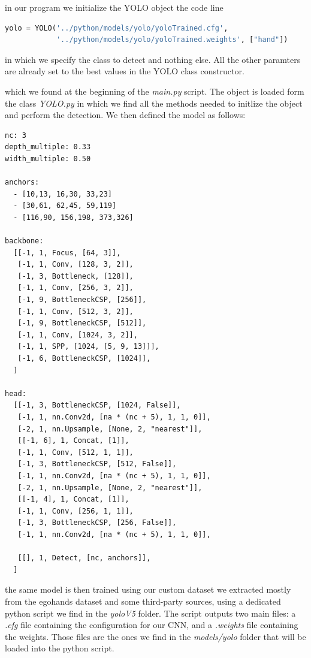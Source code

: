 in our program we initialize the YOLO object the code line 

\begin{lstlisting}[language=python]
    yolo = YOLO('../python/models/yolo/yoloTrained.cfg',
            '../python/models/yolo/yoloTrained.weights', ["hand"])
\end{lstlisting}
in which we specify the class to detect and nothing else. All the other paramters are already set to the best values in the 
YOLO class constructor.

which we found at the beginning of the \textit{main.py} script. The object is loaded form the class \textit{YOLO.py}
in which we find all the methods needed to initlize the object and perform the detection. We then defined the model as follows:

\begin{lstlisting}[]
nc: 3
depth_multiple: 0.33
width_multiple: 0.50

anchors:
  - [10,13, 16,30, 33,23] 
  - [30,61, 62,45, 59,119]
  - [116,90, 156,198, 373,326] 

backbone:
  [[-1, 1, Focus, [64, 3]],
   [-1, 1, Conv, [128, 3, 2]],
   [-1, 3, Bottleneck, [128]],
   [-1, 1, Conv, [256, 3, 2]],
   [-1, 9, BottleneckCSP, [256]],
   [-1, 1, Conv, [512, 3, 2]], 
   [-1, 9, BottleneckCSP, [512]],
   [-1, 1, Conv, [1024, 3, 2]],
   [-1, 1, SPP, [1024, [5, 9, 13]]],
   [-1, 6, BottleneckCSP, [1024]],
  ]

head:
  [[-1, 3, BottleneckCSP, [1024, False]],
   [-1, 1, nn.Conv2d, [na * (nc + 5), 1, 1, 0]],
   [-2, 1, nn.Upsample, [None, 2, "nearest"]],
   [[-1, 6], 1, Concat, [1]],
   [-1, 1, Conv, [512, 1, 1]],
   [-1, 3, BottleneckCSP, [512, False]],
   [-1, 1, nn.Conv2d, [na * (nc + 5), 1, 1, 0]],
   [-2, 1, nn.Upsample, [None, 2, "nearest"]],
   [[-1, 4], 1, Concat, [1]],
   [-1, 1, Conv, [256, 1, 1]],
   [-1, 3, BottleneckCSP, [256, False]],
   [-1, 1, nn.Conv2d, [na * (nc + 5), 1, 1, 0]],

   [[], 1, Detect, [nc, anchors]],
  ]
\end{lstlisting}

the same model is then trained using our custom dataset we extracted mostly from the egohands dataset and some third-party sources, using a dedicated python script we find in the \textit{yoloV5} folder.
The script outputs two main files: a \textit{.cfg} file containing the configuration for our CNN, and a \textit{.weights} file containing the weights. Those files are the ones we find in the \textit{models/yolo} folder
that will be loaded into the python script. 

